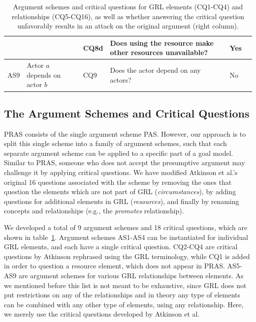 \documentclass[11.5pt,two column]{llncs}
\begin{document}
\begin{table}[h]
\begin{tabular}{|l|l|l|l|l|l|}
&&CQ8d & Does using the resource make other resources unavailable? & Yes\\ %
\hline
AS9 & Actor $a$ depends on actor $b$ & CQ9 & Does the actor depend on any actors? & No\\
\hline
\end{tabular}
\caption{Argument schemes and critical questions for GRL elements (CQ1-CQ4) and relationships (CQ5-CQ16), as well as whether answering the critical question unfavorably results in an attack on the original argument (right column).}
\label{table:argument-schemes}
\end{table}

\subsection{The Argument Schemes and Critical Questions}

PRAS consists of the single argument scheme PAS.  However, our approach is to split this single scheme into a family of argument schemes, such that each separate argument scheme can be applied to a specific part of a goal model. Similar to PRAS, someone who does not accept the presumptive argument may challenge it by applying critical questions. We have modified Atkinson et al.'s original 16 questions associated with the scheme \cite{atkinson2006argumentation} by removing the ones that question the elements which are not part of GRL (\emph{circumstances}), by adding questions for additional elements in GRL (\emph{resources}), and finally by renaming concepts and relationships (e.g., the \emph{promotes} relationship).

We developed a total of 9 argument schemes and 18 critical questions, which are shown in table~\ref{table:argument-schemes}. Argument schemes AS1-AS4 can be instantiated for individual GRL elements, and each have a single critical question. CQ2-CQ4 are critical questions by Atkinson rephrased using the GRL terminology, while CQ1 is added in order to question a resource element, which does not appear in PRAS. AS5-AS9 are argument schemes for various GRL relationships between elements. As we mentioned before%
this list is not meant to be exhaustive, since GRL does not put restrictions on any of the relationships and  in theory any type of elements can be combined with any other type of elements, using any relationship. Here, we merely use the critical questions developed by Atkinson et al. %
 
\end{document}
